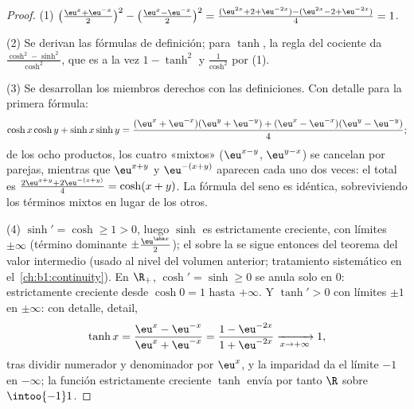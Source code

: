 \begin{proof}
(1) $\bigl(\frac{\eu^x + \eu^{-x}}{2}\bigr)^2 - \bigl(\frac{\eu^x -
\eu^{-x}}{2}\bigr)^2 = \frac{(\eu^{2x} + 2 + \eu^{-2x}) - (\eu^{2x} -
2 + \eu^{-2x})}{4} = 1$.

(2) Se derivan las fórmulas de definición; para $\tanh$, la regla del
cociente da $\frac{\cosh^2 - \sinh^2}{\cosh^2}$, que es a la vez
$1 - \tanh^2$ y $\frac{1}{\cosh^2}$ por (1).

(3) Se desarrollan los miembros derechos con las definiciones. Con
detalle para la primera fórmula:
\[
\cosh x\cosh y + \sinh x\sinh y
= \frac{(\eu^x + \eu^{-x})(\eu^y + \eu^{-y})
+ (\eu^x - \eu^{-x})(\eu^y - \eu^{-y})}{4} ;
\]
de los ocho productos, los cuatro «mixtos» ($\eu^{x-y}$,
$\eu^{y-x}$) se cancelan por parejas, mientras que $\eu^{x+y}$ y
$\eu^{-(x+y)}$ aparecen cada uno dos veces: el total es
$\frac{2\eu^{x+y} + 2\eu^{-(x+y)}}{4} = \cosh(x+y)$. La fórmula del
seno es idéntica, sobreviviendo los términos mixtos en lugar de los
otros.

(4) $\sinh' = \cosh \geq 1 > 0$, luego $\sinh$ es estrictamente
creciente, con límites $\pm\infty$ (término dominante
$\pm\frac{\eu^{\abs x}}{2}$); el  sobre la  se sigue
entonces del teorema del valor intermedio (usado al nivel del volumen
anterior; tratamiento sistemático en el~\cref{ch:b1:continuity}). En
$\R_+$, $\cosh' = \sinh \geq 0$ se anula solo en $0$: estrictamente
creciente desde $\cosh 0 = 1$ hasta $+\infty$. Y $\tanh' > 0$ con
límites $\pm 1$ en $\pm\infty$: con detalle,
detail,
\[
\tanh x = \frac{\eu^x - \eu^{-x}}{\eu^x + \eu^{-x}}
= \frac{1 - \eu^{-2x}}{1 + \eu^{-2x}}
\xrightarrow[x \to +\infty]{} 1 ,
\]
tras dividir numerador y denominador por $\eu^x$, y la imparidad da el
límite $-1$ en $-\infty$; la función estrictamente creciente $\tanh$
envía por tanto $\R$ sobre $\intoo{-1}1$.
\end{proof}

